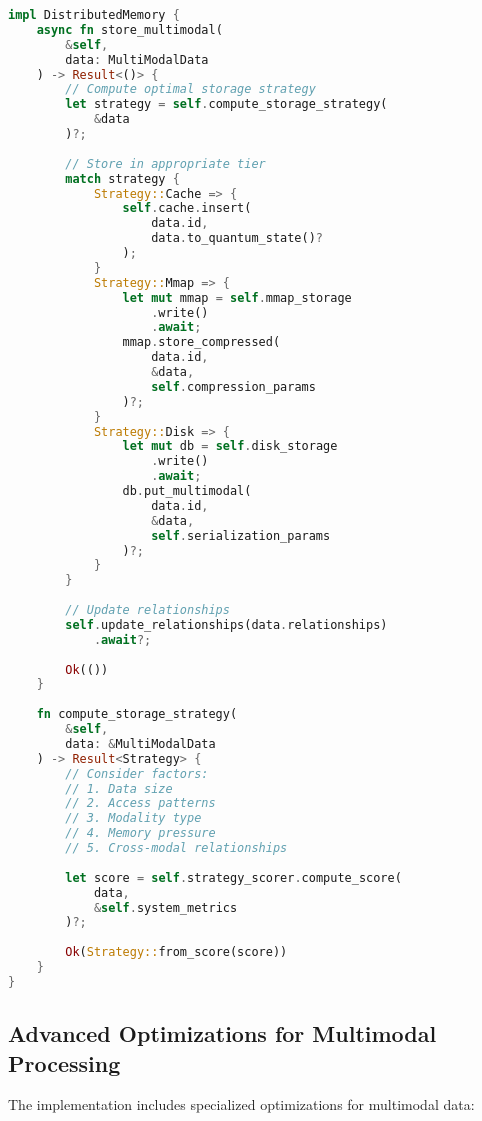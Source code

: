 \documentclass[10pt,twocolumn]{article}
\begin{document}
\begin{lstlisting}[language=Rust]
impl DistributedMemory {
    async fn store_multimodal(
        &self,
        data: MultiModalData
    ) -> Result<()> {
        // Compute optimal storage strategy
        let strategy = self.compute_storage_strategy(
            &data
        )?;
        
        // Store in appropriate tier
        match strategy {
            Strategy::Cache => {
                self.cache.insert(
                    data.id,
                    data.to_quantum_state()?
                );
            }
            Strategy::Mmap => {
                let mut mmap = self.mmap_storage
                    .write()
                    .await;
                mmap.store_compressed(
                    data.id,
                    &data,
                    self.compression_params
                )?;
            }
            Strategy::Disk => {
                let mut db = self.disk_storage
                    .write()
                    .await;
                db.put_multimodal(
                    data.id,
                    &data,
                    self.serialization_params
                )?;
            }
        }
        
        // Update relationships
        self.update_relationships(data.relationships)
            .await?;
            
        Ok(())
    }
    
    fn compute_storage_strategy(
        &self,
        data: &MultiModalData
    ) -> Result<Strategy> {
        // Consider factors:
        // 1. Data size
        // 2. Access patterns
        // 3. Modality type
        // 4. Memory pressure
        // 5. Cross-modal relationships
        
        let score = self.strategy_scorer.compute_score(
            data,
            &self.system_metrics
        )?;
        
        Ok(Strategy::from_score(score))
    }
}
\end{lstlisting}

\subsection{Advanced Optimizations for Multimodal Processing}
The implementation includes specialized optimizations for multimodal data:
\end{document}
